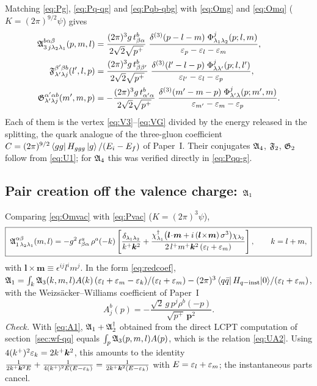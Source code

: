 Matching \eqref{eq:Pg}, \eqref{eq:Pq-qg} and \eqref{eq:Pqb-qbg} with \eqref{eq:Omg} and \eqref{eq:Omq}
($K=(2\pi)^{9/2}\psi$) gives
\begin{align}
\mathfrak{A}^{b\alpha\beta}_{3\,j\lambda_{2}\lambda_{1}}(p,m,l)&=
\frac{(2\pi)^{3}g\,t^{b}_{\beta\alpha}}{2\sqrt2\sqrt{p^{+}}}\;
\frac{\delta^{(3)}(p-l-m)\;\Phi^{j}_{\lambda_{1}\lambda_{2}}(p;l,m)}{\varepsilon_{p}-\varepsilon_{l}-\varepsilon_{m}},
\label{eq:A3}\\
\mathfrak{F}^{\beta'\beta b}_{\lambda'\lambda j}(l',l,p)&=
\frac{(2\pi)^{3}g\,t^{b}_{\beta\beta'}}{2\sqrt2\sqrt{p^{+}}}\;
\frac{\delta^{(3)}(l'-l-p)\;\Phi^{j}_{\lambda\lambda'}(p;l,l')}{\varepsilon_{l'}-\varepsilon_{l}-\varepsilon_{p}},
\label{eq:F}\\
\mathfrak{G}^{\alpha'\alpha b}_{\lambda'\lambda j}(m',m,p)&=
-\frac{(2\pi)^{3}g\,t^{b}_{\alpha'\alpha}}{2\sqrt2\sqrt{p^{+}}}\;
\frac{\delta^{(3)}(m'-m-p)\;\Phi^{j}_{\lambda'\lambda}(p;m',m)}{\varepsilon_{m'}-\varepsilon_{m}-\varepsilon_{p}} .
\label{eq:G}
\end{align}
Each of them is the vertex \eqref{eq:V3}--\eqref{eq:VG} divided by the energy released in the
splitting, the quark analogue of the three-gluon coefficient
$C=(2\pi)^{9/2}\left\langle gg\right|H_{ggg}\left|g\right\rangle/(E_{i}-E_{f})$ of Paper~I. Their conjugates
$\mathfrak{A}_{4}$, $\mathfrak{F}_{2}$, $\mathfrak{G}_{2}$ follow from \eqref{eq:U1}; for $\mathfrak{A}_{4}$ this was verified directly
in \eqref{eq:Pqq-g}.

\subsection{Pair creation off the valence charge: $\mathfrak{A}_{1}$}

Comparing \eqref{eq:Omvac} with \eqref{eq:Pvac} ($K=(2\pi)^{3}\psi$),
\begin{equation}
\boxed{\;
\mathfrak{A}^{\alpha\beta}_{1\,\lambda_{2}\lambda_{1}}(m,l)=
-g^{2}\,t^{a}_{\beta\alpha}\,\rho^{a}(-k)\left[
\frac{\delta_{\lambda_{1}\lambda_{2}}}{k^{+}\bm k^{2}}
+\frac{\chi^{\dagger}_{\lambda_{1}}\big(\bm l\!\cdot\!\bm m+i\,(\bm l\!\times\!\bm m)\,\sigma^{3}\big)\chi_{\lambda_{2}}}
{2\,l^{+}m^{+}\bm k^{2}\,(\varepsilon_{l}+\varepsilon_{m})}\right],\qquad k=l+m,\;}
\label{eq:A1}
\end{equation}
with $\bm l\!\times\!\bm m\equiv\epsilon^{ij}l^{i}m^{j}$. In the form \eqref{eq:redcoef},
$\mathfrak{A}_{1}=\int_{k}\mathfrak{A}_{3}(k,m,l)A(k)\,(\varepsilon_{l}+\varepsilon_{m}-\varepsilon_{k})/(\varepsilon_{l}+\varepsilon_{m})
-(2\pi)^{3}\left\langle q\bar q\right|H_{q-{\rm inst}}|0\rangle/(\varepsilon_{l}+\varepsilon_{m})$, with the
Weizs\"acker--Williams coefficient of Paper~I
\begin{equation}
A^{b}_{j}(p)=-\frac{\sqrt2\,g\,p^{j}\rho^{b}(-p)}{\sqrt{p^{+}}\,\bm p^{2}} .
\label{eq:Acoef}
\end{equation}
\emph{Check.} With \eqref{eq:A1}, $\mathfrak{A}_{1}+\mathfrak{A}_{2}^{\dagger}$ obtained from the direct LCPT
computation of section~\ref{sec:wf-qq} equals $\int_{p}\mathfrak{A}_{3}(p,m,l)A(p)$, which is the
relation \eqref{eq:UA2}. Using $4(k^{+})^{2}\varepsilon_{k}=2k^{+}\bm k^{2}$, this amounts to the identity
$\frac{1}{2k^{+}\bm k^{2}E}+\frac{1}{4(k^{+})^{2}E(E-\varepsilon_{k})}=\frac{1}{2k^{+}\bm k^{2}(E-\varepsilon_{k})}$
with $E=\varepsilon_{l}+\varepsilon_{m}$; the instantaneous parts cancel.

